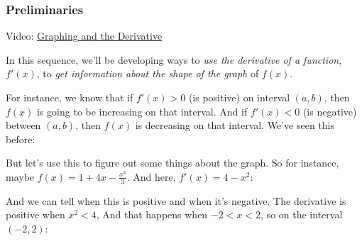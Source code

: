 \documentclass[pdftex, brazil, 12pt, twoside]{article}
\begin{document}
\subsubsection{Preliminaries}
\label{u4-graphing-1st-2st-pre}

Video: \href{https://www.youtube.com/watch?v=7ZXsaWp5spE}{Graphing and the Derivative}

In this sequence, we'll be developing ways
to \emph{use the derivative of a function}, $f'(x)$,
  to \emph{get information about the shape of the graph} of $f(x)$.

For instance, we know that if $f'(x) > 0$
(is positive) on interval $(a, b)$,
then $f(x)$ is going to be increasing on that interval.
And if $f'(x) < 0$ (is negative) between $(a, b)$,
then $f(x)$ is decreasing on that interval.
We've seen this before:

\begin{figure}[H]
  \begin{center}
  \end{center}
\end{figure}

But let's use this to figure out some things about the graph.
So for instance, maybe $\displaystyle f(x) =  1 + 4x - \frac{x^3}{3}$.
And here, $f'(x) = 4 - x^2$:

\begin{figure}[H]
  \begin{center}
  \end{center}
\end{figure}

And we can tell when this is positive
and when it's negative.
The derivative is positive when $x^2 < 4$,
And that happens when $-2 < x < 2$,
so on the interval $(-2, 2)$:
\end{document}
